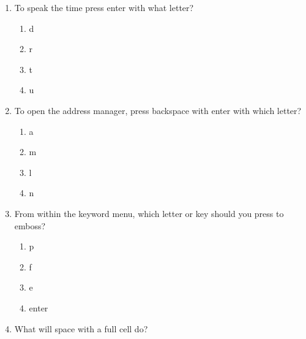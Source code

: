 \documentclass[10pt,letterpaper,twoside]{report}
\begin{document}
{{{{\begin{enumerate}
\begin{enumerate}
		      \item s
		            
		      \item g
		            
		      \item h
		            
		            
	      \end{enumerate}
	\item To speak the time press enter with what letter?
	      
	      \begin{enumerate}
		      \item d
		            
		      \item r
		            
		      \item t
		            
		      \item u
		            
		            
	      \end{enumerate}
	\item To open the address manager, press backspace with enter with which letter?
	      
	      \begin{enumerate}
		      \item a
		            
		      \item m
		            
		      \item l
		            
		      \item n
		            
		            
	      \end{enumerate}
	\item From within the keyword menu, which letter or key should you press to emboss?
	      
	      \begin{enumerate}
		      \item p
		            
		      \item f
		            
		      \item e
		            
		      \item enter
		            
		            
	      \end{enumerate}
	\item What will space with a full cell do?
	      

\end{enumerate}}}}}
\end{document}
